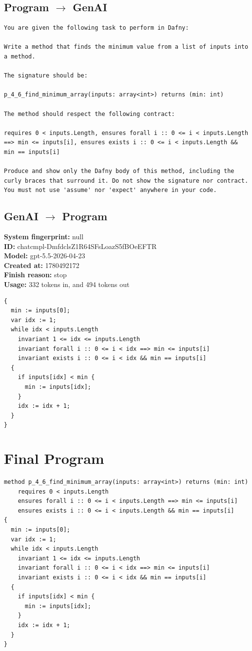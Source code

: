 \documentclass{article}
\begin{document}
\subsection*{Program $\rightarrow$ GenAI}
\begin{lstlisting}
You are given the following task to perform in Dafny:

Write a method that finds the minimum value from a list of inputs into a method.

The signature should be:

p_4_6_find_minimum_array(inputs: array<int>) returns (min: int)

The method should respect the following contract:

requires 0 < inputs.Length, ensures forall i :: 0 <= i < inputs.Length ==> min <= inputs[i], ensures exists i :: 0 <= i < inputs.Length && min == inputs[i]

Produce and show only the Dafny body of this method, including the curly braces that surround it. Do not show the signature nor contract. You must not use 'assume' nor 'expect' anywhere in your code.
\end{lstlisting}
\subsection*{GenAI $\rightarrow$ Program}
\textbf{System fingerprint: }null
\\\textbf{ID: }chatcmpl-DmfdclsZ1R64SFsLoazS5fBOeEFTR
\\\textbf{Model: }gpt-5.5-2026-04-23
\\\textbf{Created at: }1780492172
\\\textbf{Finish reason: }stop
\\\textbf{Usage: }332 tokens in, and 494 tokens out
\begin{lstlisting}
{
  min := inputs[0];
  var idx := 1;
  while idx < inputs.Length
    invariant 1 <= idx <= inputs.Length
    invariant forall i :: 0 <= i < idx ==> min <= inputs[i]
    invariant exists i :: 0 <= i < idx && min == inputs[i]
  {
    if inputs[idx] < min {
      min := inputs[idx];
    }
    idx := idx + 1;
  }
}
\end{lstlisting}
\section*{Final Program}
\begin{lstlisting}
method p_4_6_find_minimum_array(inputs: array<int>) returns (min: int)
	requires 0 < inputs.Length
	ensures forall i :: 0 <= i < inputs.Length ==> min <= inputs[i]
	ensures exists i :: 0 <= i < inputs.Length && min == inputs[i]
{
  min := inputs[0];
  var idx := 1;
  while idx < inputs.Length
    invariant 1 <= idx <= inputs.Length
    invariant forall i :: 0 <= i < idx ==> min <= inputs[i]
    invariant exists i :: 0 <= i < idx && min == inputs[i]
  {
    if inputs[idx] < min {
      min := inputs[idx];
    }
    idx := idx + 1;
  }
}
\end{lstlisting}
\end{document}
